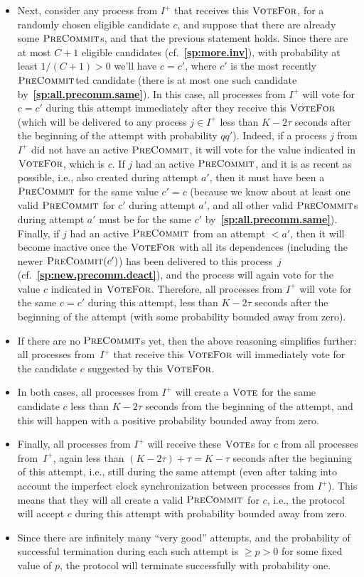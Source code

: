\documentclass[12pt,oneside]{article}
\def\refpoint#1{{\rm\textbf{\ref{#1}}}}
\let\ptref=\refpoint
\def\opsc#1{\operatorname{\textsc{#1}}}
\def\PreCommit{\opsc{PreCommit}}
\def\Vote{\opsc{Vote}}
\def\VoteFor{\opsc{VoteFor}}
\begin{document}
\begin{itemize}
\item Next, consider any process from $I^+$ that receives this $\VoteFor$, for a randomly chosen eligible candidate $c$, and suppose that there are already some $\PreCommit$s, and that the previous statement holds. Since there are at most $C+1$ eligible candidates (cf.~\ptref{sp:more.inv}), with probability at least $1/(C+1)>0$ we'll have $c=c'$, where $c'$ is the most recently $\PreCommit$ted candidate (there is at most one such candidate by~\ptref{sp:all.precomm.same}). In this case, all processes from $I^+$ will vote for $c=c'$ during this attempt immediately after they receive this $\VoteFor$ (which will be delivered to any process $j\in I^+$ less than $K-2\tau$ seconds after the beginning of the attempt with probability $qq'$). Indeed, if a process $j$ from $I^+$ did not have an active $\PreCommit$, it will vote for the value indicated in $\VoteFor$, which is $c$. If $j$ had an active $\PreCommit$, and it is as recent as possible, i.e., also created during attempt $a'$, then it must have been a $\PreCommit$ for the same value $c'=c$ (because we know about at least one valid $\PreCommit$ for $c'$ during attempt $a'$, and all other valid $\PreCommit$s during attempt $a'$ must be for the same $c'$ by~\ptref{sp:all.precomm.same}). Finally, if $j$ had an active $\PreCommit$ from an attempt $<a'$, then it will become inactive once the $\VoteFor$ with all its dependences (including the newer $\PreCommit(c')$) has been delivered to this process~$j$ (cf.~\ptref{sp:new.precomm.deact}), and the process will again vote for the value $c$ indicated in $\VoteFor$. Therefore, all processes from $I^+$ will vote for the same $c=c'$ during this attempt, less than $K-2\tau$ seconds after the beginning of the attempt (with some probability bounded away from zero).
\item If there are no $\PreCommit$s yet, then the above reasoning simplifies further: all processes from~$I^+$ that receive this $\VoteFor$ will immediately vote for the candidate $c$ suggested by this $\VoteFor$.
\item In both cases, all processes from $I^+$ will create a $\Vote$ for the same candidate $c$ less than $K-2\tau$ seconds from the beginning of the attempt, and this will happen with a positive probability bounded away from zero.
\item Finally, all processes from $I^+$ will receive these $\Vote$s for $c$ from all processes from~$I^+$, again less than $(K-2\tau)+\tau=K-\tau$ seconds after the beginning of this attempt, i.e., still during the same attempt (even after taking into account the imperfect clock synchronization between processes from $I^+$). This means that they will all create a valid $\PreCommit$ for $c$, i.e., the protocol will accept $c$ during this attempt with probability bounded away from zero.
\item Since there are infinitely many ``very good'' attempts, and the probability of successful termination during each such attempt is $\geq p>0$ for some fixed value of $p$, the protocol will terminate successfully with probability one.
\end{itemize}
\end{document}
